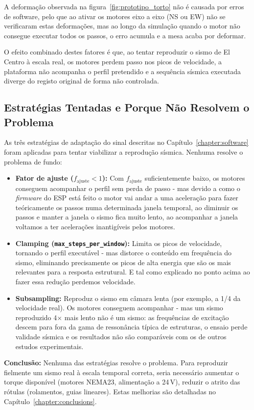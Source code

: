 A deformação observada na figura~\ref{fig:prototipo_torto} não é causada por erros de software, pelo que ao ativar os motores eixo a eixo (NS ou EW) não se verificaram estas deformações, mas ao longo da simulação quando o motor não consegue executar todos os passos, o erro acumula e a mesa acaba por deformar.

O efeito combinado destes fatores é que, ao tentar reproduzir o sismo de El Centro à escala real, os motores perdem passo nos picos de velocidade, a plataforma não acompanha o perfil pretendido e a sequência sísmica executada diverge do registo original de forma não controlada.


\subsection{Estratégias Tentadas e Porque Não Resolvem o Problema}
\label{subsec:estrategias-falhadas}

As três estratégias de adaptação do sinal descritas no Capítulo~\ref{chapter:software} foram aplicadas para tentar viabilizar a reprodução sísmica. Nenhuma resolve o problema de fundo:

\begin{itemize}
    \item \textbf{Fator de ajuste ($f_{\text{ajuste}} < 1$):} Com $f_{\text{ajuste}}$ suficientemente baixo, os motores conseguem acompanhar o perfil sem perda de passo - mas devido a como o \textit{firmware} do ESP está feito o motor vai andar a uma aceleração para fazer teóricamente os passos numa determinada janela temporal, ao diminuir os passos e manter a janela o sismo fica muito lento, ao acompanhar a janela voltamos a ter acelerações inantigíveis pelos motores.

    \item \textbf{Clamping (\texttt{max\_steps\_per\_window}):} Limita os picos de velocidade, tornando o perfil executável - mas distorce o conteúdo em frequência do sismo, eliminando precisamente os picos de alta energia que são os mais relevantes para a resposta estrutural. E tal como explicado no ponto acima ao fazer essa redução perdemos velocidade.

    \item \textbf{Subsampling:} Reproduz o sismo em câmara lenta (por exemplo, a 1/4 da velocidade real). Os motores conseguem acompanhar - mas um sismo reproduzido 4$\times$ mais lento não é um sismo: as frequências de excitação descem para fora da gama de ressonância típica de estruturas, o ensaio perde validade sísmica e os resultados não são comparáveis com os de outros estudos experimentais.
\end{itemize}

\textbf{Conclusão:} Nenhuma das estratégias resolve o problema. Para reproduzir fielmente um sismo real à escala temporal correta, seria necessário aumentar o torque disponível (motores NEMA23, alimentação a 24\,V), reduzir o atrito das rótulas (rolamentos, guias lineares). Estas melhorias são detalhadas no Capítulo~\ref{chapter:conclusions}.
